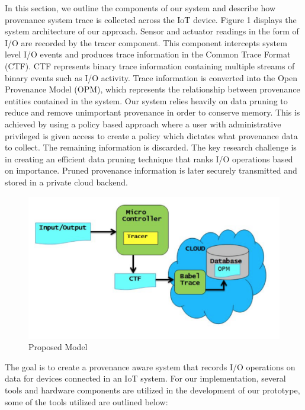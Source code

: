 In this section, we outline the components of our system and describe how provenance system trace is collected across the IoT device. Figure 1 displays the system architecture of our approach. Sensor and actuator readings in the form of I/O are recorded by the tracer component. This component intercepts system level I/O events and produces trace information in the Common Trace Format (CTF). CTF represents binary trace information containing multiple streams of binary events such as I/O activity. Trace information is converted into the Open Provenance Model (OPM), which represents the relationship between provenance entities contained in the system. Our system relies heavily on data pruning to reduce and remove unimportant provenance in order to conserve memory. This is achieved by using a policy based approach where a user with administrative privileged is given access to create a policy which dictates what provenance data to collect. The remaining information is discarded. The key research challenge is in creating an efficient data pruning technique that ranks I/O operations based on importance. Pruned provenance information is later securely transmitted and stored in a private cloud backend.

\begin{figure}[h]
\begin{center}

\includegraphics{architecture.PNG}    
\end{center}
\caption{Proposed Model}
\label{autom}
\end{figure}

The goal is to create a provenance aware system that records I/O operations on data for devices connected in an IoT system. For our implementation, several tools and hardware components are utilized in the development of our prototype, some of the tools utilized are outlined below:

